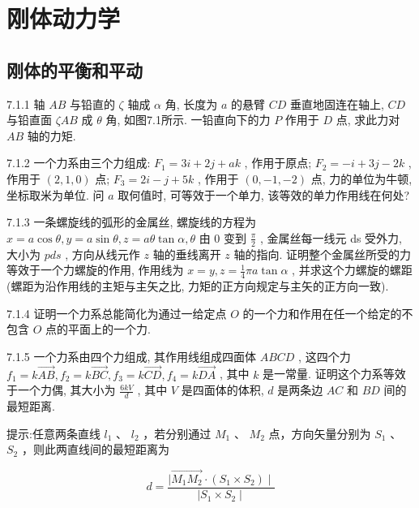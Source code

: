 \chapter{刚体动力学}

\section{刚体的平衡和平动}

\begin{problem}{7.1.1}
轴 $AB$ 与铅直的 $\zeta$ 轴成 $\alpha$ 角, 长度为 $a$ 的悬臂 $CD$ 垂直地固连在轴上, $CD$ 与铅直面 $\zeta AB$ 成 $\theta$ 角, 如图7.1所示. 一铅直向下的力 $P$ 作用于 $D$ 点, 求此力对 $AB$ 轴的力矩.
\begin{center}

\end{center}
\end{problem}
\clearpage


\begin{problem}{7.1.2}
一个力系由三个力组成: $F_{1} = 3i + 2j + ak$ , 作用于原点; $F_{2} = -i + 3j - 2k$ , 作用于 $(2,1,0)$ 点; $F_{3} = 2i - j + 5k$ , 作用于 $(0, -1, -2)$ 点, 力的单位为牛顿, 坐标取米为单位. 问 $a$ 取何值时, 可等效于一个单力, 该等效的单力作用线在何处?
\end{problem}
\clearpage


\begin{problem}{7.1.3}
一条螺旋线的弧形的金属丝, 螺旋线的方程为 $x = a\cos \theta, y = a\sin \theta, z = a\theta \tan \alpha, \theta$ 由 0 变到 $\frac{\pi}{2}$ , 金属丝每一线元 ds 受外力, 大小为 $pds$ , 方向从线元作 $z$ 轴的垂线离开 $z$ 轴的指向. 证明整个金属丝所受的力等效于一个力螺旋的作用, 作用线为 $x = y, z = \frac{1}{4}\pi a\tan \alpha$ , 并求这个力螺旋的螺距 (螺距为沿作用线的主矩与主矢之比, 力矩的正方向规定与主矢的正方向一致).
\end{problem}
\clearpage


\begin{problem}{7.1.4}
证明一个力系总能简化为通过一给定点 $O$ 的一个力和作用在任一个给定的不包含 $O$ 点的平面上的一个力.
\end{problem}
\clearpage


\begin{problem}{7.1.5}
一个力系由四个力组成, 其作用线组成四面体 $ABCD$ , 这四个力 $f_{1} = k \overrightarrow{AB}, f_{2} = k \overrightarrow{BC}, f_{3} = k \overrightarrow{CD}, f_{4} = k \overrightarrow{DA}$ , 其中 $k$ 是一常量. 证明这个力系等效于一个力偶, 其大小为 $\frac{6kV}{d}$ , 其中 $V$ 是四面体的体积, $d$ 是两条边 $AC$ 和 $BD$ 间的最短距离.

提示:任意两条直线 $l_{1}$ 、 $l_{2}$ ，若分别通过 $M_{1}$ 、 $M_{2}$ 点，方向矢量分别为 $S_{1}$ 、 $S_{2}$ ，则此两直线间的最短距离为

\[
d = \frac {\mid \overrightarrow {M _ {1} M _ {2}} \cdot (S _ {1} \times S _ {2}) \mid}{\mid S _ {1} \times S _ {2} \mid}
\]
\end{problem}
\clearpage


